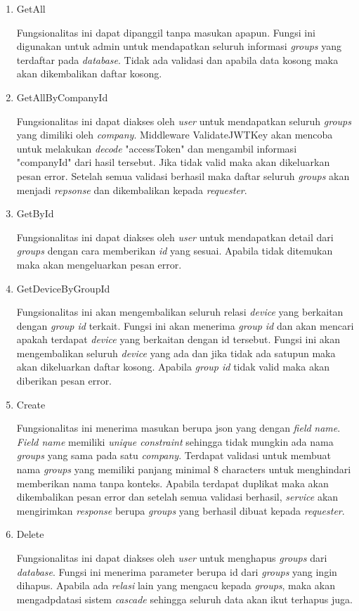 \begin{enumerate}
  \item GetAll

        Fungsionalitas ini dapat dipanggil tanpa masukan apapun. Fungsi ini digunakan untuk admin untuk mendapatkan seluruh informasi \textit{groups} yang terdaftar pada \textit{database}. Tidak ada validasi dan apabila data kosong maka akan dikembalikan daftar kosong.

  \item GetAllByCompanyId

        Fungsionalitas ini dapat diakses oleh \textit{user} untuk mendapatkan seluruh \textit{groups} yang dimiliki oleh \textit{company}. Middleware ValidateJWTKey akan mencoba untuk melakukan \textit{decode} "accessToken" dan mengambil informasi "companyId" dari hasil tersebut. Jika tidak valid maka akan dikeluarkan pesan error. Setelah semua validasi berhasil maka daftar seluruh \textit{groups} akan menjadi \textit{repsonse} dan dikembalikan kepada \textit{requester}.

  \item GetById

        Fungsionalitas ini dapat diakses oleh \textit{user} untuk mendapatkan detail dari \textit{groups} dengan cara memberikan \textit{id} yang sesuai. Apabila tidak ditemukan maka akan mengeluarkan pesan error.

  \item GetDeviceByGroupId


        Fungsionalitas ini akan mengembalikan seluruh relasi \textit{device} yang berkaitan dengan \textit{group id} terkait. Fungsi ini akan menerima \textit{group id} dan akan mencari apakah terdapat \textit{device} yang berkaitan dengan id tersebut. Fungsi ini akan mengembalikan seluruh \textit{device} yang ada dan jika tidak ada satupun maka akan dikeluarkan daftar kosong. Apabila \textit{group id} tidak valid maka akan diberikan pesan error.

  \item Create

        Fungsionalitas ini menerima masukan berupa json yang dengan \textit{field} \textit{name}. \textit{Field name} memiliki \textit{unique constraint} sehingga tidak mungkin ada nama \textit{groups} yang sama pada satu \textit{company}. Terdapat validasi untuk membuat nama \textit{groups} yang memiliki panjang minimal 8 characters untuk menghindari memberikan nama tanpa konteks. Apabila terdapat duplikat maka akan dikembalikan pesan error dan setelah semua validasi berhasil, \textit{service} akan mengirimkan \textit{response} berupa \textit{groups} yang berhasil dibuat kepada \textit{requester}.

  \item Delete

        Fungsionalitas ini dapat diakses oleh \textit{user} untuk menghapus \textit{groups} dari \textit{database}. Fungsi ini menerima parameter berupa id dari \textit{groups} yang ingin dihapus. Apabila ada \textit{relasi} lain yang mengacu kepada \textit{groups}, maka akan mengadpdatasi sistem \textit{cascade} sehingga seluruh data akan ikut terhapus juga.

\end{enumerate}


